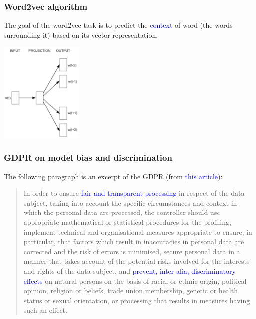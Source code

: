 \documentclass[9pt]{beamer}
\begin{document}
\begin{frame}
  \frametitle{Word2vec algorithm}

  The goal of the word2vec task is to predict the
  \textcolor{blue}{context} of word (the words surrounding it) based
  on its vector representation.

  \begin{center}
    \includegraphics[width = 4cm]{images/w2v.png}
  \end{center}
\end{frame}

\begin{frame}
  \frametitle{GDPR on model bias and discrimination}

  The following paragraph is an excerpt of the GDPR (from
  \href{http://www.privacy-regulation.eu/en/r71.htm}{
    \textcolor{blue}{this article}}):

  \bigskip

  \begin{quote}
    In order to ensure \textcolor{blue}{fair and transparent
      processing} in respect of the data subject, taking into account
    the specific circumstances and context in which the personal data
    are processed, the controller should use appropriate mathematical
    or statistical procedures for the profiling, implement technical
    and organisational measures appropriate to ensure, in particular,
    that factors which result in inaccuracies in personal data are
    corrected and the risk of errors is minimised, secure personal
    data in a manner that takes account of the potential risks
    involved for the interests and rights of the data subject, and
    \textcolor{blue}{prevent, inter alia, discriminatory effects} on
    natural persons on the basis of racial or ethnic origin, political
    opinion, religion or beliefs, trade union membership, genetic or
    health status or sexual orientation, or processing that results in
    measures having such an effect.
  \end{quote}
\end{frame}
\end{document}
